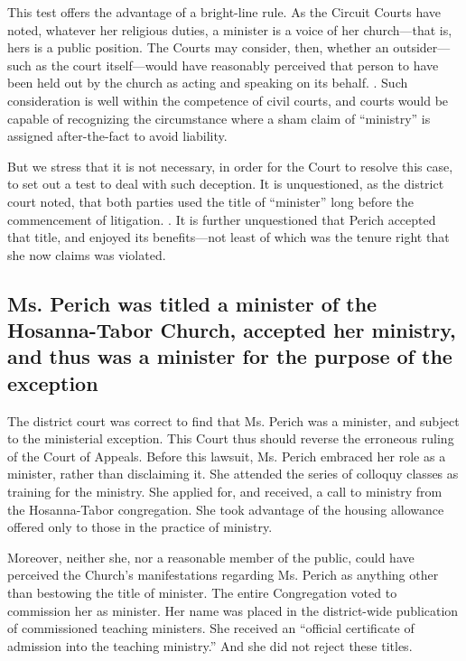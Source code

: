 \documentclass[12pt,\documentclassflag]{lawbrief}
\def\HTDist#1{\pincite{Hosanna-Tabor I}{#1}}
\begin{document}
This test offers the advantage of a bright-line rule. As the Circuit Courts have noted, whatever her religious duties, a minister is a voice of her church---that is, hers is a public position. The Courts may consider, then, whether an outsider---such as the court itself---would have reasonably perceived that person to have been held out by the church as acting and speaking on its behalf. \Seeeg {}. Such consideration is well within the competence of civil courts, and courts would be capable of recognizing the circumstance where a sham claim of ``ministry'' is assigned after-the-fact to avoid liability.  

But we stress that it is not necessary, in order for the Court to resolve this case, to set out a test to deal with such deception. It is unquestioned, as the district court noted, that both parties used the title of ``minister'' long before the commencement of litigation. \See \HTDist{891}.  It is further unquestioned that Perich accepted that title, and enjoyed its benefits---not least of which was the tenure right that she now claims was violated. 

\subsection{Ms. Perich was titled a minister of the Hosanna-Tabor Church, accepted her ministry, and thus was a minister for the purpose of the exception}
 
The district court was correct to find that Ms. Perich was a minister, and subject to the ministerial exception. This Court thus should reverse the erroneous ruling of the Court of Appeals. Before this lawsuit, Ms. Perich embraced her role as a minister, rather than disclaiming it. She attended the series of colloquy classes as training for the ministry. She applied for, and received, a call to ministry from the Hosanna-Tabor congregation. She took advantage of the housing allowance offered only to those in the practice of ministry.

Moreover, neither she, nor a reasonable member of the public, could have perceived the Church's manifestations regarding Ms. Perich as anything other than bestowing the title of minister. The entire Congregation voted to commission her as minister. Her name was placed in the district-wide publication of commissioned teaching ministers. She received an ``official certificate of admission into the teaching ministry.'' And she did not reject these titles.
\end{document}
